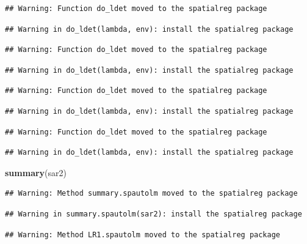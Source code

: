 \documentclass[11pt,]{article}
\newenvironment{Shaded}{\begin{snugshade}}{\end{snugshade}}
\newcommand{\KeywordTok}[1]{\textcolor[rgb]{0.13,0.29,0.53}{\textbf{#1}}}
\newcommand{\NormalTok}[1]{#1}
\begin{document}
\begin{verbatim}
## Warning: Function do_ldet moved to the spatialreg package
\end{verbatim}

\begin{verbatim}
## Warning in do_ldet(lambda, env): install the spatialreg package
\end{verbatim}

\begin{verbatim}
## Warning: Function do_ldet moved to the spatialreg package
\end{verbatim}

\begin{verbatim}
## Warning in do_ldet(lambda, env): install the spatialreg package
\end{verbatim}

\begin{verbatim}
## Warning: Function do_ldet moved to the spatialreg package
\end{verbatim}

\begin{verbatim}
## Warning in do_ldet(lambda, env): install the spatialreg package
\end{verbatim}

\begin{verbatim}
## Warning: Function do_ldet moved to the spatialreg package
\end{verbatim}

\begin{verbatim}
## Warning in do_ldet(lambda, env): install the spatialreg package
\end{verbatim}

\begin{Shaded}
\begin{Highlighting}[]
\KeywordTok{summary}\NormalTok{(sar2)}
\end{Highlighting}
\end{Shaded}

\begin{verbatim}
## Warning: Method summary.spautolm moved to the spatialreg package
\end{verbatim}

\begin{verbatim}
## Warning in summary.spautolm(sar2): install the spatialreg package
\end{verbatim}

\begin{verbatim}
## Warning: Method LR1.spautolm moved to the spatialreg package
\end{verbatim}
\end{document}

